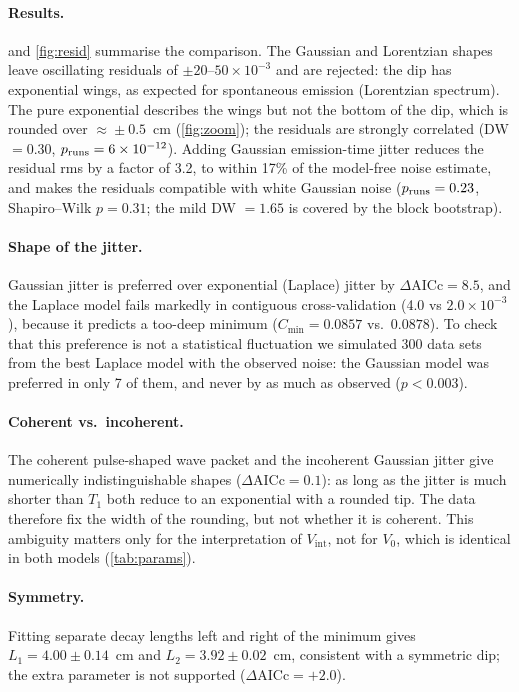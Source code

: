 \documentclass{article}
\newcommand{\Vi}{V_{\mathrm{int}}}
\begin{document}
\paragraph{Results.}  and \cref{fig:resid} summarise the
comparison. The Gaussian and Lorentzian shapes leave oscillating residuals of
$\pm20$--$50\times10^{-3}$ and are rejected: the dip has exponential wings, as
expected for spontaneous emission (Lorentzian spectrum). The pure
exponential describes the wings but not the bottom of the dip, which is
rounded over $\approx\!\pm0.5$~cm (\cref{fig:zoom}); the residuals are
strongly correlated (DW $=0.30$, $p_{\rm runs}=6\times10^{-12}$). Adding
Gaussian emission-time jitter reduces the residual rms by a factor of 3.2,
to within 17\% of the model-free noise estimate, and makes the residuals
compatible with white Gaussian noise ($p_{\rm runs}=0.23$, Shapiro--Wilk
$p=0.31$; the mild DW $=1.65$ is covered by the block bootstrap).

\paragraph{Shape of the jitter.} Gaussian jitter is preferred over
exponential (Laplace) jitter by $\Delta\mathrm{AICc}=8.5$, and the Laplace
model fails markedly in contiguous cross-validation (4.0 vs
$2.0\times10^{-3}$), because it predicts a too-deep minimum
($C_{\min}=0.0857$ vs.\ $0.0878$). To check that this preference is not a
statistical fluctuation we simulated 300 data sets from the best Laplace
model with the observed noise: the Gaussian model was preferred in only 7 of
them, and never by as much as observed ($p<0.003$).

\paragraph{Coherent vs.\ incoherent.} The coherent pulse-shaped wave packet
and the incoherent Gaussian jitter give numerically indistinguishable shapes
($\Delta\mathrm{AICc}=0.1$): as long as the jitter is much shorter than $T_1$
both reduce to an exponential with a rounded tip. The data therefore fix the
width of the rounding, but not whether it is coherent. This ambiguity matters
only for the interpretation of $\Vi$, not for $V_0$, which is identical in
both models (\cref{tab:params}).

\paragraph{Symmetry.} Fitting separate decay lengths left and right of the
minimum gives $L_1=4.00\pm0.14$~cm and $L_2=3.92\pm0.02$~cm, consistent
with a symmetric dip; the extra parameter is not supported
($\Delta\mathrm{AICc}=+2.0$).
\end{document}
